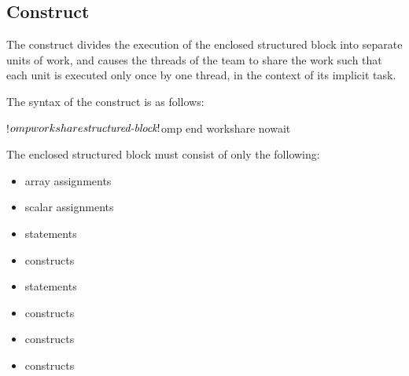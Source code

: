 
\vspace{3\baselineskip}
\begin{fortranspecific}
\vspace{-1\baselineskip}
\subsection{ Construct}
\label{subsec:workshare Construct}
\summary
The  construct divides the execution of the enclosed structured block into
separate units of work, and causes the threads of the team to share the work such that
each unit is executed only once by one thread, in the context of its implicit task.

\syntax
The syntax of the  construct is as follows:

\begin{ompfPragma}
!$omp workshare
    \plc{structured-block}
!$omp end workshare \plc{[}nowait\plc{]}
\end{ompfPragma}

The enclosed structured block must consist of only the following:

\begin{itemize}
\item array assignments

\item scalar assignments

\item {} statements

\item {} constructs

\item {} statements

\item {} constructs

\item {} constructs

\item {} constructs


\end{itemize}
\end{fortranspecific}
